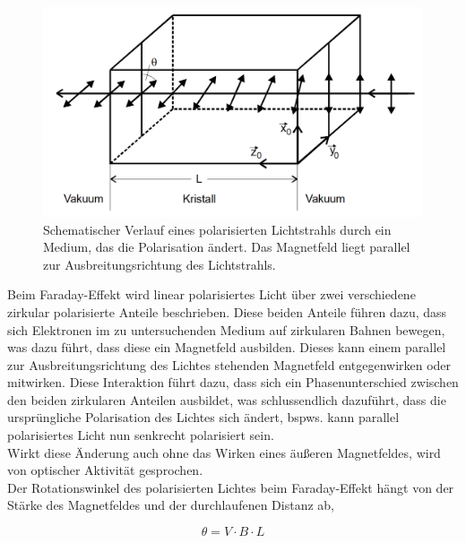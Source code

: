 \begin{figure}[H]
    \centering
    \includegraphics[width=\textwidth]{Bilder/faradayeffekt.png}
    \caption{Schematischer Verlauf eines polarisierten Lichtstrahls durch ein Medium, das die Polarisation ändert. Das Magnetfeld liegt parallel zur Ausbreitungsrichtung des Lichtstrahls. \cite{anhang}}
    \label{fig:faradayeffekt}
\end{figure}

Beim Faraday-Effekt wird linear polarisiertes Licht über zwei verschiedene zirkular polarisierte Anteile beschrieben. Diese beiden Anteile führen dazu, dass sich Elektronen im zu untersuchenden Medium auf zirkularen Bahnen bewegen, was dazu führt, dass diese ein Magnetfeld ausbilden.
Dieses kann einem parallel zur Ausbreitungsrichtung des Lichtes stehenden Magnetfeld entgegenwirken oder mitwirken. Diese Interaktion führt dazu, dass sich ein Phasenunterschied zwischen den beiden zirkularen Anteilen ausbildet,
was schlussendlich dazuführt, dass die ursprüngliche Polarisation des Lichtes sich ändert, bspws. kann parallel polarisiertes Licht nun senkrecht polarisiert sein. \\

Wirkt diese Änderung auch ohne das Wirken eines äußeren Magnetfeldes, wird von optischer Aktivität gesprochen. \\

Der Rotationswinkel des polarisierten Lichtes beim Faraday-Effekt hängt von der Stärke des Magnetfeldes und der durchlaufenen Distanz ab,

\begin{equation}
    \theta = V \cdot B \cdot L 
    \label{eq:verdet}
\end{equation}

